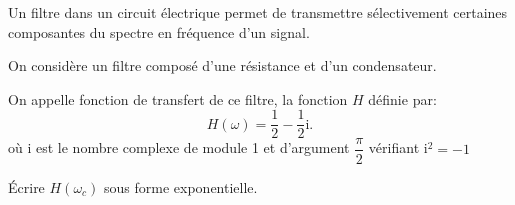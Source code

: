 \medskip

Un filtre dans un circuit électrique permet de transmettre sélectivement certaines composantes du spectre en fréquence d'un signal.

On considère un filtre composé d'une résistance et d'un condensateur.

On appelle fonction de transfert de ce filtre, la fonction $H$ définie par: 
\[H(\omega) = \dfrac12 - \dfrac12\text{i}.\]
où i est le nombre complexe de module 1 et d'argument $\dfrac{\pi}{2}$ vérifiant i$^2 = -1$

Écrire $H\left(\omega_{c}\right)$ sous forme exponentielle.

\bigskip
